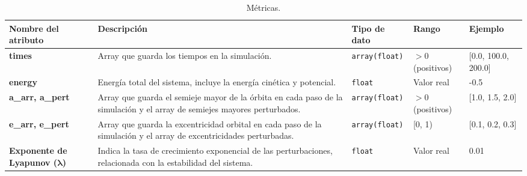 \begin{table}[H]
    \centering
    \caption{Métricas.}
    \label{tab:diccionario_métricas}
    \begin{adjustbox}{max width=\textwidth}
        \begin{tabular}{@{}p{4cm} p{5cm} p{2cm} p{2cm} p{3cm}@{}}
            \toprule
            \textbf{Nombre del atributo} & \textbf{Descripción} & \textbf{Tipo de dato} & \textbf{Rango} & \textbf{Ejemplo} \\
            \midrule
            \textbf{times} & Array que guarda los tiempos en la simulación. & \texttt{array(float)} & \(>0\) (positivos) & [0.0, 100.0, 200.0] \\
            \midrule
            \textbf{energy} & Energía total del sistema, incluye la energía cinética y potencial. & \texttt{float} & Valor real & -0.5 \\
            \midrule
            \textbf{a\_arr, a\_pert} & Array que guarda el semieje mayor de la órbita en cada paso de la simulación y el array de semiejes mayores perturbados. & \texttt{array(float)} & \(>0\) (positivos) & [1.0, 1.5, 2.0] \\
            \midrule
            \textbf{e\_arr, e\_pert} & Array que guarda la excentricidad orbital en cada paso de la simulación y el array de excentricidades perturbadas. & \texttt{array(float)} & [0, 1) & [0.1, 0.2, 0.3] \\
            \midrule
            \textbf{Exponente de Lyapunov ($\mathbf{\lambda}$)}& Indica la tasa de crecimiento exponencial de las perturbaciones, relacionada con la estabilidad del sistema. & \texttt{float} & Valor real & 0.01 \\
            \bottomrule
        \end{tabular}
    \end{adjustbox}
\end{table}

